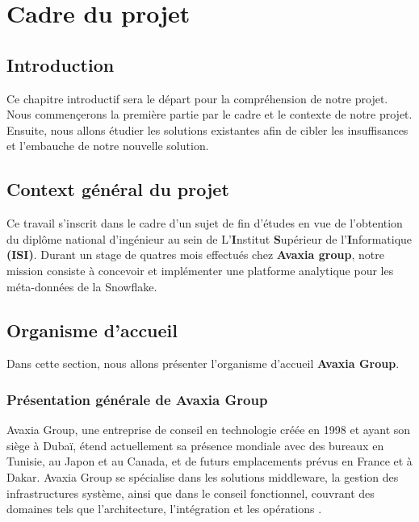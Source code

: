 \chapter{Cadre du projet}
\section*{Introduction}
\par {\huge C}e chapitre introductif sera le départ pour la compréhension de notre projet. 
Nous commençerons la première partie par le cadre et le contexte de notre projet. 
Ensuite, nous allons étudier les solutions existantes afin de cibler les insuffisances et l'embauche de notre nouvelle solution.

\section{Context général du projet}
\par Ce travail s'inscrit dans le cadre d'un sujet de fin d'études en vue de l'obtention du diplôme national d'ingénieur au sein de L'\textbf{I}nstitut \textbf{S}upérieur de l'\textbf{I}nformatique \textbf{(ISI)}.
 Durant un stage de quatres mois effectués chez \textbf{Avaxia group}, notre mission consiste à concevoir et implémenter une platforme analytique pour les méta-données de la Snowflake.
\section[Organisme d'accueil]{Organisme d'accueil}
\par Dans cette section, nous allons présenter l'organisme d'accueil \textbf{Avaxia Group}. 
\subsection{Présentation générale de Avaxia Group}

\par Avaxia Group, une entreprise de conseil en technologie créée en 1998 et ayant son siège à Dubaï, étend actuellement sa présence mondiale avec des bureaux  en Tunisie, au Japon et au Canada, et de futurs emplacements prévus en France et à Dakar. 
Avaxia Group se spécialise dans les solutions middleware, la gestion des infrastructures système, ainsi que dans le conseil fonctionnel, couvrant des domaines tels que l'architecture, l'intégration et les opérations \cite{avaxia}.

